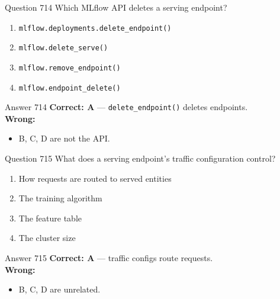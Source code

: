 \documentclass[aspectratio=169,11pt]{beamer}
\begin{document}
	\begin{frame}{Question 714}
		Which MLflow API deletes a serving endpoint?
		\begin{enumerate}[label=\Alph*.]
			\item \texttt{mlflow.deployments.delete\_endpoint()}
			\item \texttt{mlflow.delete\_serve()}
			\item \texttt{mlflow.remove\_endpoint()}
			\item \texttt{mlflow.endpoint\_delete()}
		\end{enumerate}
	\end{frame}
	\begin{frame}{Answer 714}
		\textbf{Correct: A} --- \texttt{delete\_endpoint()} deletes endpoints.\\
		\vspace{0.5em}
		\textbf{Wrong:}
		\begin{itemize}
			\item B, C, D are not the API.
		\end{itemize}
	\end{frame}
	
	\begin{frame}{Question 715}
		What does a serving endpoint's traffic configuration control?
		\begin{enumerate}[label=\Alph*.]
			\item How requests are routed to served entities
			\item The training algorithm
			\item The feature table
			\item The cluster size
		\end{enumerate}
	\end{frame}
	\begin{frame}{Answer 715}
		\textbf{Correct: A} --- traffic configs route requests.\\
		\vspace{0.5em}
		\textbf{Wrong:}
		\begin{itemize}
			\item B, C, D are unrelated.
		\end{itemize}
	\end{frame}
	
\end{document}
